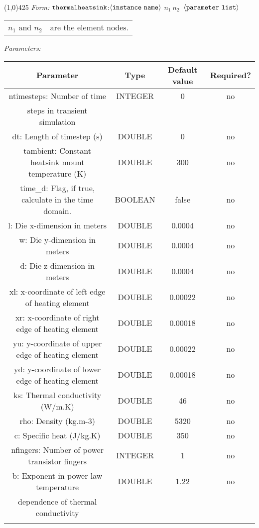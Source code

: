 \documentclass{article}
\begin{document}
\\
\hrulefill\linethickness{0.5mm}\line(1,0){425}
\normalsize
\newline
\textit{Form:}
\newline
$\tt thermalheatsink$:$\langle \tt{instance\ name}\rangle$ $n_1\ n_2\
$ $\langle \tt{parameter\ list}\rangle$
\newline
\begin{tabular}{r l}
$n_1$ and $n_2$ & are the element nodes. \\
\end{tabular}
\newline
\textit{Parameters:}
\begin{table}[H]
\begin{tabular}{|c|c|c|c|}
\hline
Parameter&Type&Default value&Required?\\
\hline
ntimesteps: Number of time & INTEGER & 0 & no \\
steps in transient simulation & & & \\
\hline dt: Length of timestep (s) & DOUBLE & 0 & no \\
\hline
tambient: Constant heatsink mount temperature (K) & DOUBLE & 300 & no \\
\hline time\_d: Flag, if true, calculate in the time domain. &
BOOLEAN & false & no \\
\hline
l: Die x-dimension in meters & DOUBLE & 0.0004 & no \\
\hline
w: Die y-dimension in meters & DOUBLE & 0.0004 & no \\
\hline
d: Die z-dimension in meters & DOUBLE & 0.0004 & no \\
\hline
xl: x-coordinate of left edge of heating element & DOUBLE &
0.00022 & no \\
\hline xr: x-coordinate of right edge of heating element & DOUBLE
& 0.00018 & no \\
\hline yu: y-coordinate of upper edge of heating element & DOUBLE
& 0.00022 & no \\
\hline yd: y-coordinate of lower edge of heating element & DOUBLE
& 0.00018 & no \\
\hline
ks: Thermal conductivity (W/m.K) & DOUBLE & 46 & no \\
\hline
rho: Density (kg.m-3) & DOUBLE & 5320 & no \\
\hline
c: Specific heat (J/kg.K) & DOUBLE & 350 & no \\
\hline
nfingers: Number of power transistor fingers & INTEGER & 1 & no \\
\hline
b: Exponent in power law temperature & DOUBLE & 1.22 & no \\
dependence of thermal conductivity & & & \\
\par
\hline
\end{tabular}
\end{table}
\end{document}
